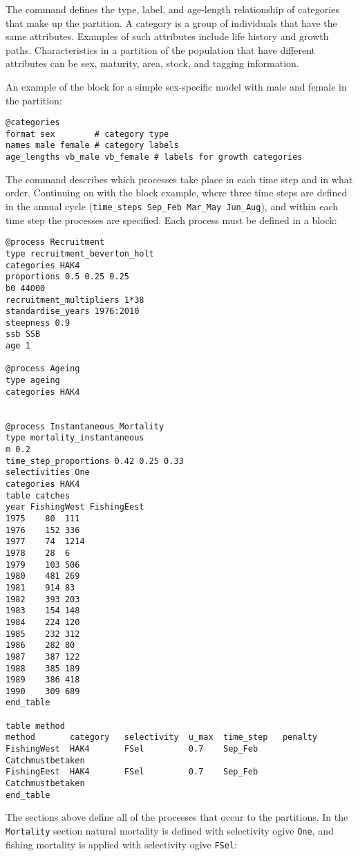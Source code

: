 The  command defines the type, label, and age-length relationship of categories that make up the partition. A category is a group of individuals that have the same attributes. Examples of such attributes include life history and growth paths. Characteristics in a partition of the population that have different attributes can be sex, maturity, area, stock, and tagging information.

An example of the  block for a simple sex-specific model with male and female in the partition:

{\small{\begin{verbatim}
@categories
format sex        # category type
names male female # category labels
age_lengths vb_male vb_female # labels for growth categories
		\end{verbatim}}}

The  command describes which processes take place in each time step and in what order. Continuing on with the  block example, where three time steps are defined in the annual cycle (\texttt{time\_steps Sep\_Feb Mar\_May Jun\_Aug}), and within each time step the processes are specified. Each process must be defined in a  block:

{\small{\begin{verbatim}
@process Recruitment
type recruitment_beverton_holt
categories HAK4
proportions 0.5 0.25 0.25
b0 44000
recruitment_multipliers 1*38
standardise_years 1976:2010
steepness 0.9
ssb SSB
age 1

@process Ageing
type ageing
categories HAK4

		
@process Instantaneous_Mortality
type mortality_instantaneous
m 0.2
time_step_proportions 0.42 0.25 0.33
selectivities One
categories HAK4
table catches
year FishingWest FishingEest
1975	80	111
1976	152	336
1977	74	1214
1978	28	6
1979	103	506
1980	481	269
1981	914	83
1982	393	203
1983	154	148
1984	224	120
1985	232	312
1986	282	80
1987	387	122
1988	385	189
1989	386	418
1990	309	689
end_table
		
table method
method  	 category 	selectivity  u_max 	time_step 	penalty
FishingWest  HAK4   	FSel 		 0.7 	Sep_Feb 	Catchmustbetaken
FishingEest  HAK4   	FSel 		 0.7 	Sep_Feb 	Catchmustbetaken
end_table
\end{verbatim}}}

The sections above define all of the processes that occur to the partitions. In the \texttt{Mortality} section natural mortality is defined with selectivity ogive \texttt{One}, and fishing mortality is applied with selectivity ogive \texttt{FSel}:

